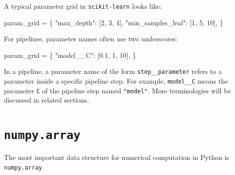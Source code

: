\documentclass[
  letterpaper,
  DIV=11,
  numbers=noendperiod]{scrreprt}
\newenvironment{Shaded}{\begin{snugshade}}{\end{snugshade}}
\newcommand{\DecValTok}[1]{\textcolor[rgb]{0.68,0.00,0.00}{#1}}
\newcommand{\FloatTok}[1]{\textcolor[rgb]{0.68,0.00,0.00}{#1}}
\newcommand{\NormalTok}[1]{\textcolor[rgb]{0.00,0.23,0.31}{#1}}
\newcommand{\OperatorTok}[1]{\textcolor[rgb]{0.37,0.37,0.37}{#1}}
\newcommand{\StringTok}[1]{\textcolor[rgb]{0.13,0.47,0.30}{#1}}
\theoremstyle{definition}
\theoremstyle{definition}
\theoremstyle{plain}
\theoremstyle{plain}
\theoremstyle{remark}
\begin{document}
A typical parameter grid in \texttt{scikit-learn} looks like:

\begin{Shaded}
\begin{Highlighting}[]
\NormalTok{param\_grid }\OperatorTok{=}\NormalTok{ \{}
    \StringTok{"max\_depth"}\NormalTok{: [}\DecValTok{2}\NormalTok{, }\DecValTok{3}\NormalTok{, }\DecValTok{4}\NormalTok{],}
    \StringTok{"min\_samples\_leaf"}\NormalTok{: [}\DecValTok{1}\NormalTok{, }\DecValTok{5}\NormalTok{, }\DecValTok{10}\NormalTok{],}
\NormalTok{\}}
\end{Highlighting}
\end{Shaded}

For pipelines, parameter names often use two underscores:

\begin{Shaded}
\begin{Highlighting}[]
\NormalTok{param\_grid }\OperatorTok{=}\NormalTok{ \{}
    \StringTok{"model\_\_C"}\NormalTok{: [}\FloatTok{0.1}\NormalTok{, }\DecValTok{1}\NormalTok{, }\DecValTok{10}\NormalTok{],}
\NormalTok{\}}
\end{Highlighting}
\end{Shaded}

\begin{tcolorbox}[enhanced jigsaw, arc=.35mm, bottomrule=.15mm, bottomtitle=1mm, breakable, colback=white, colbacktitle=quarto-callout-note-color!10!white, colframe=quarto-callout-note-color-frame, coltitle=black, left=2mm, leftrule=.75mm, opacityback=0, opacitybacktitle=0.6, rightrule=.15mm, title=\textcolor{quarto-callout-note-color}{\faInfo}\hspace{0.5em}{Note}, titlerule=0mm, toprule=.15mm, toptitle=1mm]

In a pipeline, a parameter name of the form \texttt{step\_\_parameter}
refers to a parameter inside a specific pipeline step. For example,
\texttt{model\_\_C} means the parameter \texttt{C} of the pipeline step
named \texttt{"model"}. More terminologies will be discussed in related
sections.

\end{tcolorbox}

\section{\texorpdfstring{\texttt{numpy.array}}{numpy.array}}\label{numpy.array}

The most important data structure for numerical computation in Python is
\texttt{numpy.array}.
\end{document}
